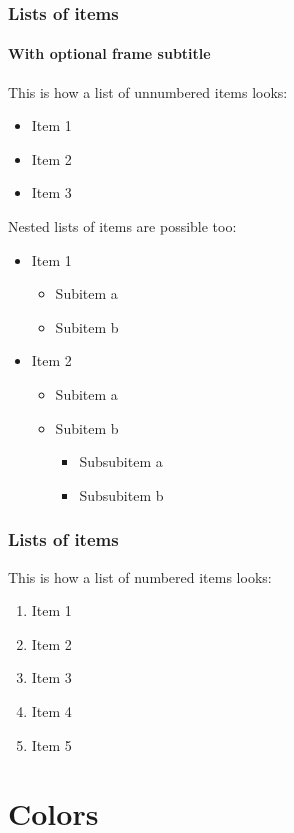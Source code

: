 \documentclass[aspectratio=169]{beamer}
\begin{document}
\begin{frame}
    \frametitle{Lists of items}
    \framesubtitle{With optional frame subtitle}
    This is how a list of unnumbered items looks:
    \begin{itemize}
        \item Item 1
        \item Item 2
        \item Item 3
    \end{itemize}
    \vspace{.25cm}
    Nested lists of items are possible too:
    \begin{itemize}
        \item Item 1
            \begin{itemize}
                \item Subitem a
                \item Subitem b
            \end{itemize}
        \item Item 2
            \begin{itemize}
                \item Subitem a
                \item Subitem b
                    \begin{itemize}
                        \item Subsubitem a
                        \item Subsubitem b
                    \end{itemize}
            \end{itemize}
    \end{itemize}
\end{frame}

\begin{frame}
    \frametitle{Lists of items}
    This is how a list of numbered items looks:\\[.25cm]
    \begin{enumerate}
        \itemsep.5cm
        \item Item 1
        \item Item 2
        \item Item 3
        \item Item 4
        \item Item 5
    \end{enumerate}
\end{frame}


\section{Colors}
\end{document}
